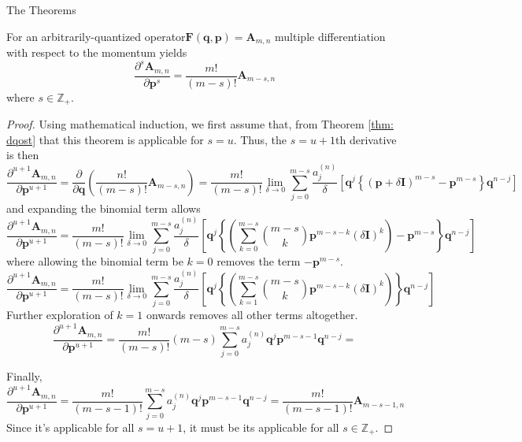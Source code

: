 \documentclass[aspectratio=169]{beamer}
\begin{document}
\begin{frame}[allowframebreaks]{The Theorems}
		\begin{theorem}
			For an arbitrarily-quantized operator$ \textbf{F}(\textbf{q},\textbf{p})=\textbf{A}_{m,n}$ multiple differentiation with respect to the momentum yields
			\begin{equation}
				\frac{\partial^s\textbf{A}_{m,n}}{\partial\textbf{p}^s}=\frac{m!}{(m-s)!}\textbf{A}_{m-s,n}
			\end{equation}
			where $s\in\mathbb{Z}_+$. 
		\end{theorem}
		\begin{proof}
			Using mathematical induction, we first assume that, from Theorem \ref{thm: dqost} that this theorem is applicable for $s=u$. Thus, the $s=u+1$th derivative is then
			\begin{equation}
				\frac{\partial^{u+1}{\textbf{A}_{m,n}}}{\partial\textbf{p}^{u+1}}=\frac{\partial}{\partial\textbf{q}}\left(\frac{n!}{(m-s)!}\textbf{A}_{m-s,n}\right)=\frac{m!}{(m-s)!}\lim_{\delta\to0}\sum_{j=0}^{m-s}\frac{a_j^{(n)}}{\delta}\left[\textbf{q}^j\left\{(\textbf{p}+\delta\textbf{I})^{m-s}-\textbf{p}^{m-s}\right\}\textbf{q}^{n-j}\right]
			\end{equation}
			and expanding the binomial term allows
			\begin{equation}
				\frac{\partial^{u+1}{\textbf{A}_{m,n}}}{\partial\textbf{p}^{u+1}}=\frac{m!}{(m-s)!}\lim_{\delta\to0}\sum_{j=0}^{m-s}\frac{a_j^{(n)}}{\delta}\left[\textbf{q}^j\left\{\left(\sum_{k=0}^{m-s}\binom{m-s}{k}\textbf{p}^{m-s-k}(\delta\textbf{I})^k\right)-\textbf{p}^{m-s}\right\}\textbf{q}^{n-j}\right]
			\end{equation}
			where allowing the binomial term be $k=0$ removes the term $-\textbf{p}^{m-s}$. 
			\begin{equation}
				\frac{\partial^{u+1}{\textbf{A}_{m,n}}}{\partial\textbf{p}^{u+1}}=\frac{m!}{(m-s)!}\lim_{\delta\to0}\sum_{j=0}^{m-s}\frac{a_j^{(n)}}{\delta}\left[\textbf{q}^j\left\{\left(\sum_{k=1}^{m-s}\binom{m-s}{k}\textbf{p}^{m-s-k}(\delta\textbf{I})^k\right)\right\}\textbf{q}^{n-j}\right]
			\end{equation}
			Further exploration of $k=1$ onwards removes all other terms altogether. 
			\begin{equation}
				\frac{\partial^{u+1}{\textbf{A}_{m,n}}}{\partial\textbf{p}^{u+1}}=\frac{m!}{(m-s)!}(m-s)\sum_{j=0}^{m-s}a_j^{(n)}\textbf{q}^j\textbf{p}^{m-s-1}\textbf{q}^{n-j}=
			\end{equation}
			
			\framebreak
			Finally,
			\begin{equation}
				\frac{\partial^{u+1}{\textbf{A}_{m,n}}}{\partial\textbf{p}^{u+1}}=\frac{m!}{(m-s-1)!}\sum_{j=0}^{m-s}a_j^{(n)}\textbf{q}^j\textbf{p}^{m-s-1}\textbf{q}^{n-j}=\frac{m!}{(m-s-1)!}\textbf{A}_{m-s-1,n}
			\end{equation}
			Since it's applicable for all $s=u+1$, it must be its applicable for all $s\in\mathbb{Z}_+$.
		\end{proof}
		

\end{frame}
\end{document}
